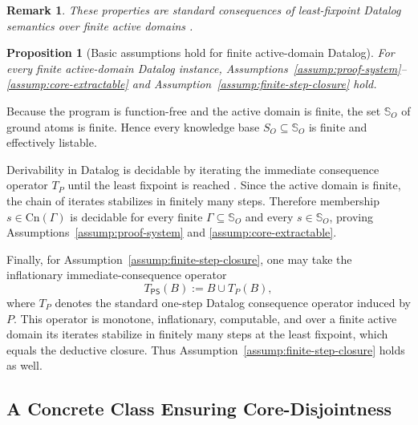 \documentclass[journal,onecolumn]{IEEEtran}
\makeatletter
\newcommand{\Cn}{\text{Cn}}
\newtheorem{proposition}{Proposition}[section]
\newtheorem{remark}{Remark}[section]
\numberwithin{equation}{section}
\renewenvironment{proof}[1][\proofname]{\par
  \pushQED{\qed}%
  \normalfont \topsep6\p@\@plus6\p@\relax
  \trivlist
  \item[\hskip\labelsep
        \itshape
    #1\@addpunct{.}]\ignorespaces
}{%
  \popQED\endtrivlist\@endpefalse
}
\makeatother
\begin{document}
\begin{remark}
These properties are standard consequences of least-fixpoint Datalog
semantics over finite active domains
\cite{van1976semantics,ceri1989you,abiteboul1995foundations,
dantsin2001complexity}.
\end{remark}

\begin{proposition}[Basic assumptions hold for finite active-domain Datalog]
\label{prop:datalog-basic-assumptions}
For every finite active-domain Datalog instance,
Assumptions~\textup{\ref{assump:proof-system}}--\textup{\ref{assump:core-extractable}}
and Assumption~\textup{\ref{assump:finite-step-closure}} hold.
\end{proposition}

\begin{proof}
Because the program is function-free and the active domain is finite,
the set \(\mathbb{S}_O\) of ground atoms is finite.
Hence every knowledge base \(S_O\subseteq\mathbb{S}_O\) is finite and
effectively listable.

Derivability in Datalog is decidable by iterating the immediate
consequence operator \(T_P\) until the least fixpoint is reached
\cite{van1976semantics,ceri1989you,abiteboul1995foundations,
dantsin2001complexity}. Since the active domain is finite, the chain
of iterates stabilizes in finitely many steps.
Therefore membership \(s\in\Cn(\Gamma)\) is decidable for every finite
\(\Gamma\subseteq\mathbb{S}_O\) and every \(s\in\mathbb{S}_O\),
proving Assumptions~\ref{assump:proof-system} and
\ref{assump:core-extractable}.

Finally, for Assumption~\ref{assump:finite-step-closure}, one may take
the inflationary immediate-consequence operator
\[
  T_{\mathsf{PS}}(B):=B\cup T_P(B),
\]
where \(T_P\) denotes the standard one-step Datalog consequence
operator induced by \(P\). This operator is monotone, inflationary,
computable, and over a finite active domain its iterates stabilize in
finitely many steps at the least fixpoint, which equals the deductive
closure. Thus Assumption~\ref{assump:finite-step-closure} holds as
well.
\end{proof}

\subsection{A Concrete Class Ensuring Core-Disjointness}
\label{app:datalog-disjointness}
\end{document}
